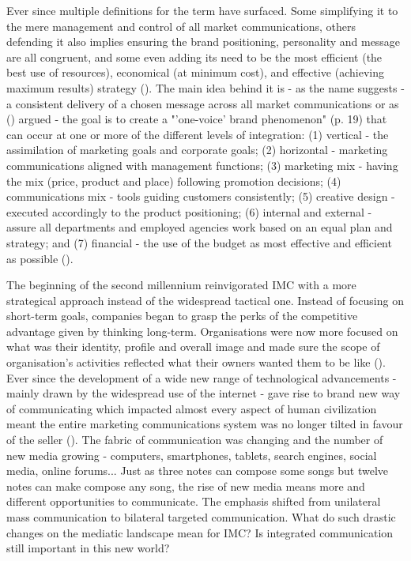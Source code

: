 \documentclass[11pt]{article}
\begin{document}
Ever since multiple definitions for the term have surfaced. Some simplifying it to the mere management and control of all market communications, others defending it also implies ensuring the brand positioning, personality and message are all congruent, and some even adding its need to be the most efficient (the best use of resources), economical (at minimum cost), and effective (achieving maximum results) strategy (\cite{smith}). The main idea behind it is - as the name suggests - a consistent delivery of a chosen message across all market communications or as  \citeauthor{kitchen} (\citeyear{kitchen}) argued - the goal is to create a "'one-voice' brand phenomenon" (p. 19) that can occur at one or more of the different levels of integration: (1) vertical - the assimilation of marketing goals and corporate goals; (2) horizontal - marketing communications aligned with management functions; (3) marketing mix - having the mix (price, product and place) following promotion decisions; (4) communications mix - tools guiding customers consistently; (5) creative design - executed accordingly to the product positioning; (6) internal and external - assure all departments and employed agencies work based on an equal plan and strategy; and (7) financial - the use of the budget as most effective and efficient as possible (\cite{smith}). 

The beginning of the second millennium reinvigorated IMC with a more strategical approach instead of the widespread tactical one. Instead of focusing on short-term goals, companies began to grasp the perks of the competitive advantage given by thinking long-term. Organisations were now more focused on what was their identity, profile and overall image and made sure the scope of organisation's activities reflected what their owners wanted them to be like (\cite{holm}). Ever since the development of a wide new range of technological advancements - mainly drawn by the widespread use of the internet - gave rise to brand new way of communicating which impacted almost every aspect of human civilization meant the entire marketing communications system was no longer tilted in favour of the seller (\cite{kliatchko}). The fabric of communication was changing and the number of new media growing - computers, smartphones, tablets, search engines, social media, online forums...  Just as three notes can compose some songs but twelve notes can make compose any song, the rise of new media means more and different opportunities to communicate. The emphasis shifted from unilateral mass communication to bilateral targeted communication. What do such drastic changes on the mediatic landscape mean for IMC? Is integrated communication still important in this new world?
\end{document}

